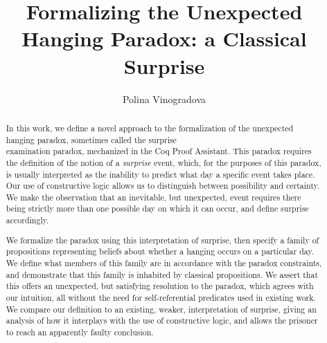 \documentclass[runningheads]{llncs}
\begin{document}
%
\title{Formalizing the Unexpected Hanging Paradox: a Classical Surprise} %
%
%
\author{Polina Vinogradova }
%
%
%
\maketitle              %
%
\begin{abstract}

  In this work, we define a novel approach to the formalization of the
  unexpected hanging paradox, sometimes called the surprise \\
  examination paradox,
  mechanized in the Coq Proof Assistant.
  This paradox requires the definition of the notion of
  a \emph{surprise} event, which, for the purposes of this paradox, is usually interpreted as
  the inability to predict what day a specific event takes place. Our use of constructive logic allows us to distinguish between possibility and
  certainty.
  We make the observation that an inevitable, but unexpected, event requires there being strictly
  more than one possible day on which it can occur, and define surprise accordingly.

  We
  formalize the paradox using this interpretation of surprise, then
  specify a family of
  propositions representing beliefs about whether a hanging occurs on a particular day.
  We define what members of this family are in accordance with the paradox constraints, and
  demonstrate that this family is inhabited by classical propositions.
  We assert that this offers an unexpected, but satisfying resolution to the paradox, which
  agrees with
  our intuition, all without the need for self-referential predicates used in existing work.
  We compare our definition to an existing, weaker, interpretation of surprise,
  giving an analysis of how it interplays with the use of constructive logic,
  and allows the prisoner to reach an apparently faulty conclusion.

\end{abstract}
%
\end{document}

